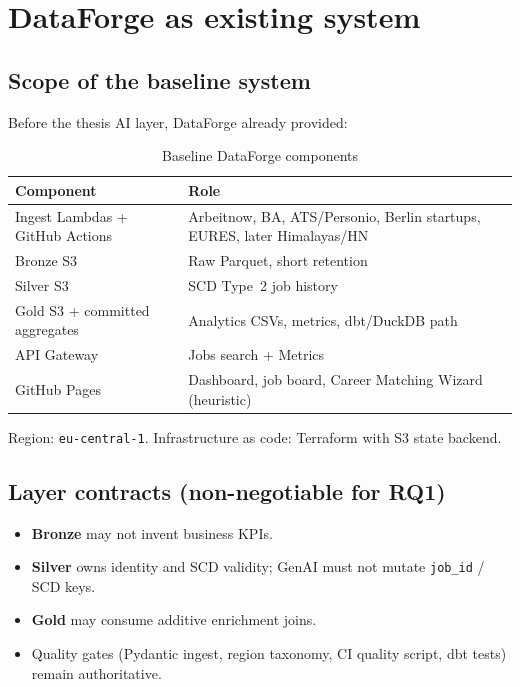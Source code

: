 \chapter{DataForge as existing system}
\label{ch:baseline}

\section{Scope of the baseline system}

Before the thesis AI layer, DataForge already provided:

\begin{table}[ht]
\centering
\caption{Baseline DataForge components}
\label{tab:baseline}
\begin{tabularx}{\textwidth}{@{}lX@{}}
\toprule
\textbf{Component} & \textbf{Role} \\
\midrule
Ingest Lambdas + GitHub Actions & Arbeitnow, BA, ATS/Personio, Berlin startups, EURES, later Himalayas/HN \\
Bronze S3 & Raw Parquet, short retention \\
Silver S3 & SCD Type~2 job history \\
Gold S3 + committed aggregates & Analytics CSVs, metrics, dbt/DuckDB path \\
API Gateway & Jobs search + Metrics \\
GitHub Pages & Dashboard, job board, Career Matching Wizard (heuristic) \\
\bottomrule
\end{tabularx}
\end{table}

Region: \texttt{eu-central-1}. Infrastructure as code: Terraform with S3 state backend.

\section{Layer contracts (non-negotiable for RQ1)}

\begin{itemize}[leftmargin=*]
  \item \textbf{Bronze} may not invent business KPIs.
  \item \textbf{Silver} owns identity and SCD validity; GenAI must not mutate \texttt{job\_id} / SCD keys.
  \item \textbf{Gold} may consume additive enrichment joins.
  \item Quality gates (Pydantic ingest, region taxonomy, CI quality script, dbt tests) remain authoritative.
\end{itemize}

